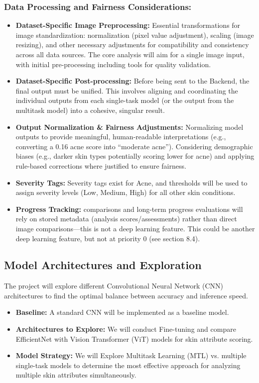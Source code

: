 \documentclass[12pt,a4paper]{article}
\begin{document}
\subsubsection{Data Processing and Fairness Considerations:}
\begin{itemize}
    \item \textbf{Dataset-Specific Image Preprocessing:} Essential transformations for image standardization: normalization (pixel value adjustment), scaling (image resizing), and other necessary adjustments for compatibility and consistency across all data sources. The core analysis will aim for a single image input, with initial pre-processing including tools for quality validation.
    \item \textbf{Dataset-Specific Post-processing:} Before being sent to the Backend, the final output must be unified. This involves aligning and coordinating the individual outputs from each single-task model (or the output from the multitask model) into a cohesive, singular result.
    \item \textbf{Output Normalization \& Fairness Adjustments:} Normalizing model outputs to provide meaningful, human-readable interpretations (e.g., converting a 0.16 acne score into ``moderate acne''). Considering demographic biases (e.g., darker skin types potentially scoring lower for acne) and applying rule-based corrections where justified to ensure fairness.
    \item \textbf{Severity Tags:} Severity tags exist for Acne, and thresholds will be used to assign severity levels (Low, Medium, High) for all other skin conditions.
    \item \textbf{Progress Tracking:} comparisons and long-term progress evaluations will rely on stored metadata (analysis scores/assessments) rather than direct image comparisons—this is not a deep learning feature. This could be another deep learning feature, but not at priority 0 (see section 8.4).
\end{itemize}

\subsection{Model Architectures and Exploration}
The project will explore different Convolutional Neural Network (CNN) architectures to find the optimal balance between accuracy and inference speed.
\begin{itemize}
    \item \textbf{Baseline:} A standard CNN will be implemented as a baseline model.
    \item \textbf{Architectures to Explore:} We will conduct Fine-tuning and compare EfficientNet with Vision Transformer (ViT) models for skin attribute scoring.
    \item \textbf{Model Strategy:} We will Explore Multitask Learning (MTL) vs. multiple single-task models to determine the most effective approach for analyzing multiple skin attributes simultaneously.
\end{itemize}
\end{document}

